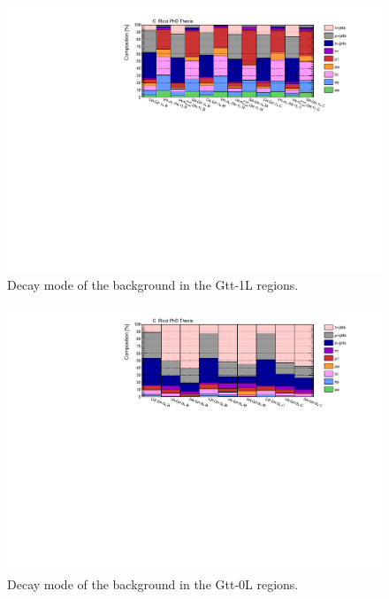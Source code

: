 \begin{figure}[htbp]
\includegraphics[width=\textwidth]{figures/strong_prod/comp_plots/Gtt_1L_tt.pdf}
\caption{Decay mode of the \ttbar background in the Gtt-1L regions.}
	\label{fig:ttcomp_Gtt1L}
\end{figure}

\begin{figure}[htbp]
\includegraphics[width=\textwidth]{figures/strong_prod/comp_plots/Gtt_0L_tt.pdf}
\caption{Decay mode of the \ttbar background in the Gtt-0L regions.}
	\label{fig:ttcomp_Gtt0L}
\end{figure}

